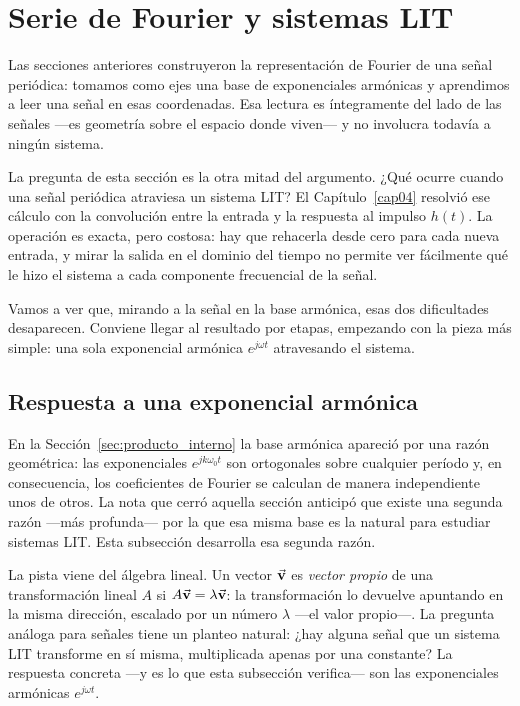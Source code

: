 \documentclass[class=book, crop=false]{standalone}
\begin{document}
\setcounter{chapter}{5}
\section{Serie de Fourier y sistemas LIT}
\label{sec:sf_lti}

Las secciones anteriores construyeron la representación de Fourier de una señal periódica: tomamos como ejes una base de exponenciales armónicas y aprendimos a leer una señal en esas coordenadas. Esa lectura es íntegramente del lado de las señales ---es geometría sobre el espacio donde viven--- y no involucra todavía a ningún sistema.

La pregunta de esta sección es la otra mitad del argumento. ¿Qué ocurre cuando una señal periódica atraviesa un sistema LIT? El Capítulo~\ref{cap04} resolvió ese cálculo con la convolución entre la entrada y la respuesta al impulso $h(t)$. La operación es exacta, pero costosa: hay que rehacerla desde cero para cada nueva entrada, y mirar la salida en el dominio del tiempo no permite ver fácilmente qué le hizo el sistema a cada componente frecuencial de la señal.

Vamos a ver que, mirando a la señal en la base armónica, esas dos dificultades desaparecen. Conviene llegar al resultado por etapas, empezando con la pieza más simple: una sola exponencial armónica $e^{j\omega t}$ atravesando el sistema.

\subsection{Respuesta a una exponencial armónica}
\label{subsec:respuesta_exp_armonica}

En la Sección~\ref{sec:producto_interno} la base armónica apareció por una razón geométrica: las exponenciales $e^{jk\omega_0 t}$ son ortogonales sobre cualquier período y, en consecuencia, los coeficientes de Fourier se calculan de manera independiente unos de otros. La nota que cerró aquella sección anticipó que existe una segunda razón ---más profunda--- por la que esa misma base es la natural para estudiar sistemas LIT. Esta subsección desarrolla esa segunda razón.

La pista viene del álgebra lineal. Un vector $\vec{\mathbf{v}}$ es \emph{vector propio} de una transformación lineal $A$ si $A\vec{\mathbf{v}} = \lambda\vec{\mathbf{v}}$: la transformación lo devuelve apuntando en la misma dirección, escalado por un número $\lambda$ ---el valor propio---. La pregunta análoga para señales tiene un planteo natural: ¿hay alguna señal que un sistema LIT transforme en sí misma, multiplicada apenas por una constante? La respuesta concreta ---y es lo que esta subsección verifica--- son las exponenciales armónicas $e^{j\omega t}$.
\end{document}
